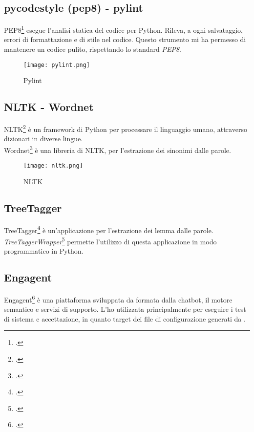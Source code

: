 \subsection*{pycodestyle (pep8) - pylint}
PEP8\footcite{site:pep8} esegue l'analisi statica del codice per Python. Rileva, a ogni salvataggio, errori di formattazione e di stile nel codice. Questo strumento mi ha permesso di mantenere un codice pulito, rispettando lo standard \emph{PEP8}\glsfirstoccur{}. 
\begin{figure}[H]
    \centering
    \texttt{[image: pylint.png]} 
    \caption{Pylint}
    \label{logo:pylint}
\end{figure}

\subsection*{NLTK - Wordnet}
NLTK\footcite{site:nltk} è un framework di Python per processare il linguaggio umano, attraverso dizionari in diverse lingue.\\
Wordnet\footcite{site:wordnet} è una libreria di NLTK, per l'estrazione dei sinonimi dalle parole.
\begin{figure}[H]
    \centering
    \texttt{[image: nltk.png]} 
    \caption{NLTK}
    \label{logo:nltk}
\end{figure}

\subsection*{TreeTagger}
TreeTagger\footcite{site:treetagger} è un'applicazione per l'estrazione dei lemma dalle parole. \textit{TreeTaggerWrapper}\footcite{site:twrapper} permette l'utilizzo di questa applicazione in modo programmatico in Python.

\subsection*{Engagent}
Engagent\footcite{site:engagent} è una piattaforma sviluppata da \company{} formata dalla chatbot, il motore semantico e servizi di supporto. L'ho utilizzata principalmente per eseguire i test di sistema e accettazione, in quanto target dei file di configurazione generati da \app{}.


